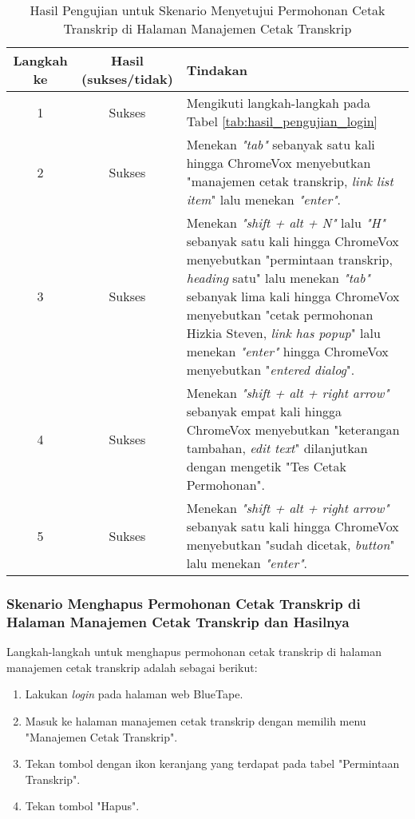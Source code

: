 \begin{table}[H]
    \centering 
    \caption{Hasil Pengujian untuk Skenario Menyetujui Permohonan Cetak Transkrip di Halaman Manajemen Cetak Transkrip}
    \label{tab:hasil_pengujian_menyetujui_permohonan_cetak_transkrip_di_halaman_manajemen_cetak_transkrip}
    \begin{tabular}{|c|c|p{10cm}|}
        \toprule
        Langkah ke & Hasil (sukses/tidak) & Tindakan \\

        \midrule
        1 & Sukses & Mengikuti langkah-langkah pada Tabel \ref{tab:hasil_pengujian_login} \\
        2 & Sukses & Menekan \textit{"tab"} sebanyak satu kali hingga ChromeVox menyebutkan "manajemen cetak transkrip, \textit{link list item}" lalu menekan \textit{"enter"}. \\
        3 & Sukses & Menekan \textit{"shift + alt + N"} lalu \textit{"H"} sebanyak satu kali hingga ChromeVox menyebutkan "permintaan transkrip, \textit{heading} satu" lalu menekan \textit{"tab"} sebanyak lima kali hingga ChromeVox menyebutkan "cetak permohonan Hizkia Steven, \textit{link has popup}" lalu menekan \textit{"enter"} hingga ChromeVox menyebutkan "\textit{entered dialog}". \\
        4 & Sukses & Menekan \textit{"shift + alt + right arrow"} sebanyak empat kali hingga ChromeVox menyebutkan "keterangan tambahan, \textit{edit text}" dilanjutkan dengan mengetik "Tes Cetak Permohonan". \\
        5 & Sukses & Menekan \textit{"shift + alt + right arrow"} sebanyak satu kali hingga ChromeVox menyebutkan "sudah dicetak, \textit{button}" lalu menekan \textit{"enter"}. \\ 

        \bottomrule

    \end{tabular}
\end{table}

\subsubsection{Skenario Menghapus Permohonan Cetak Transkrip di Halaman Manajemen Cetak Transkrip dan Hasilnya}
\label{subsubsec:skenario_menghapus_permohonan_cetak_transkrip_di_halaman_manajemen_cetak_transkrip}
Langkah-langkah untuk menghapus permohonan cetak transkrip di halaman manajemen cetak transkrip adalah sebagai berikut:

\begin{enumerate}
    \item Lakukan \textit{login} pada halaman web BlueTape.
    \item Masuk ke halaman manajemen cetak transkrip dengan memilih menu "Manajemen Cetak Transkrip".
    \item Tekan tombol dengan ikon keranjang yang terdapat pada tabel "Permintaan Transkrip".
    \item Tekan tombol "Hapus".
\end{enumerate}

